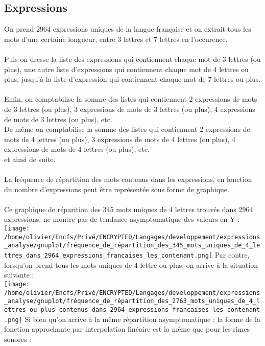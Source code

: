 \documentclass[french]{article}
\begin{document}
\subsection{Expressions}
On prend 2964 expressions uniques de la langue française et on extrait tous les mots d'une certaine longueur, entre 3 lettres et 7 lettres en l'occurence.\\
\\Puis on dresse la liste des expressions qui contiennent chaque mot de 3 lettres (ou plus), une autre liste d'expressions qui contiennent chaque mot de 4 lettres ou plus, jusqu'à la liste d'expression qui contiennent chaque mot de 7 lettres ou plus.\\
\\Enfin, on comptabilise la somme des listes qui contiennent 2 expressions de mots de 3 lettres (ou plus), 3 expressions de mots de 3 lettres (ou plus), 4 expressions de mots de 3 lettres (ou plus), etc.\\
De même on comptabilise la somme des listes qui contiennent 2 expressions de mots de 4 lettres (ou plus), 3 expressions de mots de 4 lettres (ou plus), 4 expressions de mots de 4 lettres (ou plus), etc.\\
et ainsi de suite.\\
\\La fréquence de répartition des mots contenus dans les expressions, en fonction du nombre d'expressions peut être représentée sous forme de graphique.\\
\\Ce graphique de réparition des 345 mots uniques de 4 lettres trouvés dans 2964 expressions, ne montre pas de tendance asymptomatique des valeurs en Y :\\
\texttt{[image: /home/olivier/Encfs/Privé/ENCRYPTED/Langages/developpement/expressions\_analyse/gnuplot/fréquence\_de\_répartition\_des\_345\_mots\_uniques\_de\_4\_lettres\_dans\_2964\_expressions\_francaises\_les\_contenant.png]}
\newpage
Par contre, lorsqu'on prend tous les mots uniques de 4 lettre ou plus, on arrive à la situation suivante :\\
\texttt{[image: /home/olivier/Encfs/Privé/ENCRYPTED/Langages/developpement/expressions\_analyse/gnuplot/fréquence\_de\_répartition\_des\_2763\_mots\_uniques\_de\_4\_lettres\_ou\_plus\_contenus\_dans\_2964\_expressions\_francaises\_les\_contenant.png]}
Si bien qu'on arrive à la même répartition asymptomatique : la forme de la fonction approchante par interpolation linéaire est la même que pour les rimes sonores :\\
\end{document}
